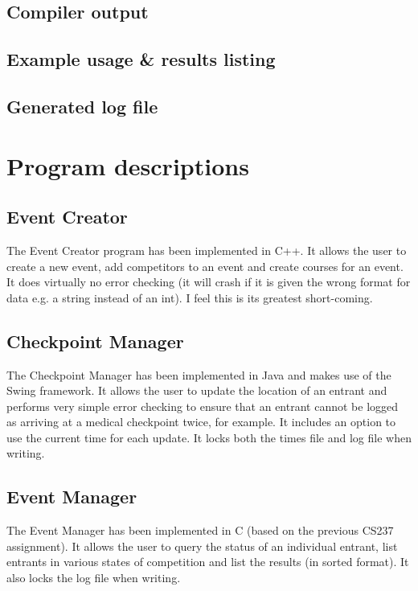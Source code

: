 \documentclass[a4paper, twoside]{article}
\begin{document}
\subsection{Compiler output}

\subsection{Example usage \& results listing}

\subsection{Generated log file}


\section{Program descriptions}
\subsection{Event Creator}
The Event Creator program has been implemented in C++. It allows the user to
create a new event, add competitors to an event and create courses for an event.
It does virtually no error checking (it will crash if it is given the wrong
format for data e.g. a string instead of an int). I feel this is its greatest
short-coming.
\subsection{Checkpoint Manager}
The Checkpoint Manager has been implemented in Java and makes use of the Swing
framework. It allows the user to update the location of an entrant and performs
very simple error checking to ensure that an entrant cannot be logged as
arriving at a medical checkpoint twice, for example. It includes an option to
use the current time for each update. It locks both the times file and log file
when writing.
\subsection{Event Manager}
The Event Manager has been implemented in C (based on the previous CS237
assignment). It allows the user to query the status of an individual entrant,
list entrants in various states of competition and list the results (in sorted
format). It also locks the log file when writing.
\end{document}
